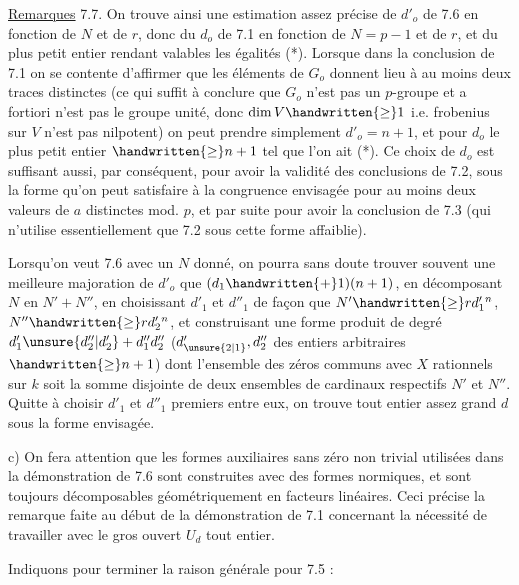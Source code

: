 \uline{Remarques} 7.7.  On trouve ainsi une estimation assez précise de $d'_o$ de 7.6  en fonction de $N$ et de $r$, donc du $d_o$ de 7.1 en fonction de $N=p-1$ et de $r$,  et du plus petit entier rendant valables les égalités (*). Lorsque dans la conclusion de 7.1 on se contente d'affirmer que les éléments de $G_o$ donnent lieu à au moins deux traces distinctes (ce qui suffit à conclure que $G_o$ n'est pas un $p$-groupe et a fortiori n'est pas le groupe unité, donc $\dim V\handwritten{\geq}1$ i.e. frobenius sur $V$ n'est pas nilpotent) on peut prendre  simplement $d'_o=n+1$, et pour $d_o$ le plus petit entier $\handwritten{\geq}n+1$ tel que l'on ait (*). Ce choix de $d_o$ est suffisant aussi, par conséquent, pour avoir la validité des
conclusions de 7.2, sous la forme  qu'on peut  satisfaire à la congruence envisagée pour au moins deux valeurs de $a$ distinctes mod. $p$, et par suite pour avoir la conclusion de 7.3 (qui n'utilise essentiellement que 7.2 sous cette forme affaiblie).

 Lorsqu'on veut 7.6 avec un $N$ donné, on  pourra sans doute trouver souvent une meilleure majoration de $d'_o$ que $(d_1\handwritten{+}1)(n+1)$, en décomposant $N$ en $N'+N''$, en choisissant $d'_1$ et $d''_1$ de façon que $N'\handwritten{\geq}rd_1'{}^n$, $N''\handwritten{\geq}rd_2'{}^n$, et construisant une forme produit de degré  $d'_1\unsure{d''_2|d'_2}+d''_1d''_2$ ($d'_{\unsure{2|1}},d''_2$ des entiers arbitraires $\handwritten{\geq}n+1$) dont l'ensemble des zéros communs avec $X$ rationnels sur $k$ soit la somme disjointe de deux ensembles de cardinaux respectifs $N'$ et $N''$. Quitte à choisir $d'_1$ et $d''_1$  premiers entre eux, on trouve  tout entier assez grand $d$  sous la forme envisagée.

c) On fera attention que les formes auxiliaires sans zéro non trivial utilisées dans la démonstration de 7.6 sont construites avec des formes normiques, et sont toujours décomposables géométriquement en facteurs linéaires. Ceci précise la remarque faite au début de la démonstration de 7.1 concernant la nécessité de travailler avec le gros ouvert $U_d$ tout entier.

Indiquons pour terminer la raison générale pour 7.5 :

